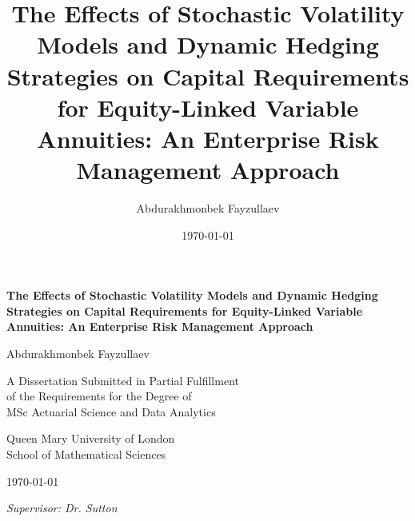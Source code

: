 \documentclass[12pt,a4paper]{report}
\title{The Effects of Stochastic Volatility Models and Dynamic Hedging Strategies on Capital Requirements for Equity-Linked Variable Annuities: An Enterprise Risk Management Approach}
\author{Abdurakhmonbek Fayzullaev}
\date{\today}
\begin{document}
\begin{titlepage}
\centering
\vspace*{1.5cm}

{\LARGE\textbf{The Effects of Stochastic Volatility Models and Dynamic Hedging Strategies on Capital Requirements for Equity-Linked Variable Annuities: An Enterprise Risk Management Approach}}

\vspace{2cm}

{\Large Abdurakhmonbek Fayzullaev}

\vspace{1.5cm}

{\large A Dissertation Submitted in Partial Fulfillment\\
of the Requirements for the Degree of\\
MSc Actuarial Science and Data Analytics}

\vspace{1.5cm}

{\large Queen Mary University of London\\
School of Mathematical Sciences}

\vspace{1.5cm}

{\large \today}

\vfill

\textit{Supervisor: Dr. Sutton}

\end{titlepage}
\end{document}
